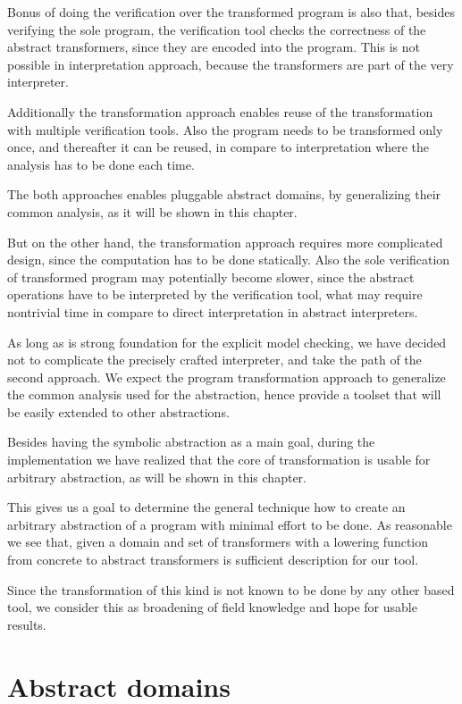 Bonus of doing the verification over the transformed program is also that,
besides verifying the sole program, the verification tool checks the
correctness of the abstract transformers, since they are encoded into the
program. This is not possible in interpretation approach, because the
transformers are part of the very interpreter.

Additionally the transformation approach enables reuse of the transformation
with multiple verification tools. Also the program needs to be transformed only
once, and thereafter it can be reused, in compare to interpretation where the
analysis has to be done each time.

The both approaches enables pluggable abstract domains, by generalizing their
common analysis, as it will be shown in this chapter.

But on the other hand, the transformation approach requires more complicated
design, since the computation has to be done statically. Also the sole
verification of transformed program may potentially become slower, since the
abstract operations have to be interpreted by the verification tool, what may
require nontrivial time in compare to direct interpretation in abstract
interpreters.

As long as \DIVINE is strong foundation for the explicit model checking, we have
decided not to complicate the precisely crafted interpreter, and take the path of
the second approach. We expect the program transformation approach to generalize
the common analysis used for the abstraction, hence provide a toolset that will be
easily extended to other abstractions.

Besides having the symbolic abstraction as a main goal, during the implementation
we have realized that the core of transformation is usable for arbitrary
abstraction, as will be shown in this chapter.

This gives us a goal to determine the general technique how to create an arbitrary
abstraction of a program with minimal effort to be done. As reasonable we see
that, given a domain and set of transformers with a lowering function from
concrete to abstract transformers is sufficient description for our tool.

Since the transformation of this kind is not known to be done by any other
\LLVM based tool, we consider this as broadening of field knowledge and hope for
usable results.

\section{Abstract domains} \label{sec:absdom}

